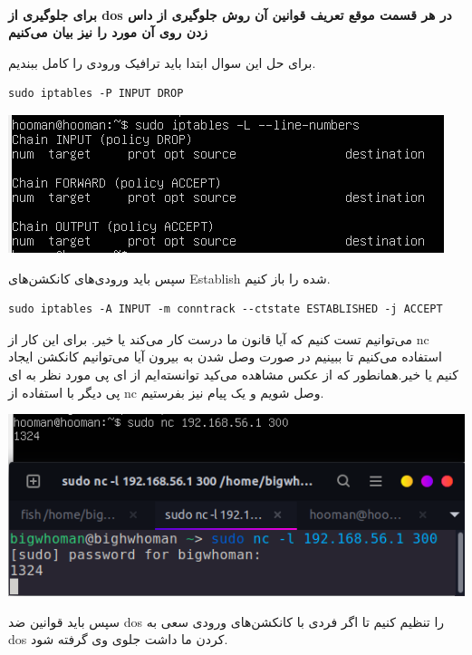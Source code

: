 \\
\begin{center}
    \textbf{برای جلوگیری از dos در هر قسمت موقع تعریف قوانین آن روش جلوگیری از 
    داس زدن روی آن مورد را نیز بیان می‌کنیم}
\end{center}
برای حل این سوال ابتدا باید ترافیک ورودی را کامل ببندیم.
\begin{latin}
\begin{lstlisting}
sudo iptables -P INPUT DROP
\end{lstlisting}
\end{latin}
\begin{center}
    \includegraphics[scale=0.45]{pics/iptables1.png}
\end{center}
سپس باید ورودی‌های کانکشن‌های Establish شده را باز کنیم.
\begin{latin}   
\begin{lstlisting}
sudo iptables -A INPUT -m conntrack --ctstate ESTABLISHED -j ACCEPT
\end{lstlisting}
\end{latin}
می‌توانیم تست کنیم که آیا قانون ما درست کار می‌کند یا خیر.
برای این کار از nc استفاده می‌کنیم تا ببینیم در صورت 
وصل شدن به بیرون آیا می‌توانیم کانکشن ایجاد کنیم یا خیر.همانطور که از عکس مشاهده می‌کید توانسته‌ایم از ای پی مورد نظر به ای پی دیگر با استفاده از nc وصل 
شویم و یک پیام نیز بفرستیم.
\begin{center}
    \includegraphics[scale=0.40]{pics/iptables2.png}
\end{center}
سپس باید قوانین ضد dos را تنظیم کنیم تا اگر 
فردی با کانکشن‌های ورودی سعی به dos کردن ما داشت جلوی وی گرفته شود.
